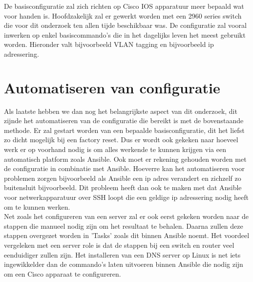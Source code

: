 De basisconfiguratie zal zich richten op Cisco IOS apparatuur meer bepaald wat voor handen is. Hoofdzakelijk zal er gewerkt worden met een 2960 series switch die voor dit onderzoek ten allen tijde beschikbaar was. De configuratie zal vooral inwerken op enkel basiscommando's die in het dagelijks leven het meest gebruikt worden. Hieronder valt bijvoorbeeld VLAN tagging en bijvoorbeeld ip adressering. 

\section{Automatiseren van configuratie}
\label{ch:automatiseren}

Als laatste hebben we dan nog het belangrijkste aspect van dit onderzoek, dit zijnde het automatiseren van de configuratie die bereikt is met de bovenstaande methode. Er zal gestart worden van een bepaalde basisconfiguratie, dit het liefst zo dicht mogelijk bij een factory reset. Dus er wordt ook gekeken naar hoeveel werk er op voorhand nodig is om alles werkende te kunnen krijgen via een automatisch platform zoals Ansible. Ook moet er rekening gehouden worden met de configuratie in combinatie met Ansible. Hoeverre kan het automatiseren voor problemen zorgen bijvoorbeeld als Ansible een ip adres verandert en zichzelf zo buitensluit bijvoorbeeld. Dit probleem heeft dan ook te maken met dat Ansible voor netwerkapparatuur over SSH loopt die een geldige ip adressering nodig heeft om te kunnen werken.
\\

Net zoals het configureren van een server zal er ook eerst gekeken worden naar de stappen die manueel nodig zijn om het resultaat te behalen. Daarna zullen deze stappen overgezet worden in 'Tasks' zoals dit binnen Ansible noemt. Het voordeel vergeleken met een server role is dat de stappen bij een switch en router veel eenduidiger zullen zijn. Het installeren van een DNS server op Linux is net iets ingewikkelder dan de commando's laten uitvoeren binnen Ansible die nodig zijn om een Cisco apparaat te configureren.





